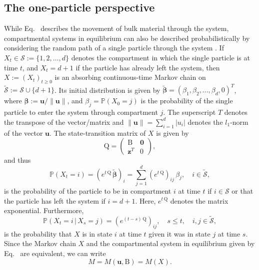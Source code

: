 \documentclass[smallextended]{svjour3}
\makeatletter
\renewcommand*{\eqref}[1]{%
  \hyperref[{#1}]{\textup{\tagform@{\ref*{#1}}}}%
}
\renewcommand{\tens}[1]{\mathrm{#1}}
\renewcommand{\vec}[1]{\mathbf{#1}}
\renewcommand{\P}{\mathbb{P}}
\newcommand{\suml}{\sum\limits}
\newcommand{\vnorms}[1]{\|#1\|}
\makeatother
\begin{document}
\subsection{The one-particle perspective}
\label{sec:the_one_particle_perspective}
While Eq.~\eqref{eqn:lin_CS_sys} describes the movement of bulk material through the system, compartmental systems in equilibrium can also be described probabilistically by considering the random path of a single particle through the system \citep{Metzler2018MGS}.
If $X_t\in\mathcal{S}:=\{1,2,\ldots,d\}$ denotes the compartment in which the single particle is at time $t$, and $X_t=d+1$ if the particle has already left the system, then $X:=(X_t)_{t\geq0}$ is an absorbing continuous-time Markov chain \citep{Norris1997} on $\widetilde{\mathcal{S}}:=\mathcal{S}\cup\{d+1\}$.
Its initial distribution is given by $\widetilde{\vec{\beta}}=(\beta_1, \beta_2, \ldots, \beta_d, 0)^T$, where $\vec{\beta}:=\vec{u}/\vnorms{\vec{u}}$, and $\beta_j=\P(X_0=j)$ is the probability of the single particle to enter the system through compartment $j$.
The superscript $T$ denotes the transpose of the vector/matrix  and $\vnorms{\vec{u}}=\sum_{i=1}^d |u_i|$ denotes the $l_1$-norm of the vector $\vec{u}$.
The state-transition matrix of $X$ is given by
\begin{equation}\label{eqn:Q}
  \tens{Q} =
  \begin{pmatrix}
    \tens{B} & \vec{0} \\
    \vec{z}^T & 0
  \end{pmatrix},
\end{equation}
and thus
\begin{equation}
  \P(X_t=i) = (e^{t\,\tens{Q}}\,\widetilde{\vec{\beta}})_i = \suml_{j=1}^d (e^{t\,\tens{Q}})_{ij}\,\beta_j, \quad i\in\widetilde{\mathcal{S}},
\end{equation}
is the probability of the particle to be in compartment $i$ at time $t$ if $i\in\mathcal{S}$ or that the particle has left the system if $i=d+1$.
Here, $e^{t\,\tens{Q}}$ denotes the matrix exponential.
Furthermore, 
\begin{equation}
  \P(X_t=i\,|\,X_s=j) = (e^{(t-s)\,\tens{Q}})_{ij},\quad s\leq t,\quad i,j\in\widetilde{\mathcal{S}},
\end{equation}
is the probability that $X$ is in state $i$ at time $t$ given it was in state $j$ at time $s$.
Since the Markov chain $X$ and the compartmental system in equilibrium given by Eq.~\eqref{eqn:lin_CS_sys} are equivalent, we can write
\begin{equation}
  M=M(\vec{u},\tens{B}) = M(X).
\end{equation}
\end{document}
